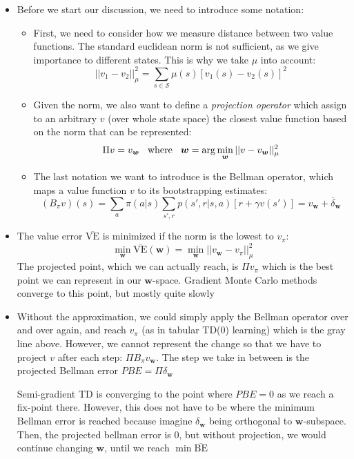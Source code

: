 \begin{itemize}
	\item Before we start our discussion, we need to introduce some notation:
	\begin{itemize}
		\item First, we need to consider how we measure distance between two value functions. The standard euclidean norm is not sufficient, as we give importance to different states. This is why we take $\mu$ into account:
		$$||v_1-v_2||_{\mu}^2 = \sum_{s\in\mathcal{S}} \mu(s)\left[v_1(s)-v_2(s)\right]^2$$
		\item Given the norm, we also want to define a \textit{projection operator} which assign to an arbitrary $v$ (over whole state space) the closest value function based on the norm that can be represented:
		$$\Pi v = v_{\bm{w}}\hspace{3mm}\text{where}\hspace{3mm}\bm{w}=\arg\min_{\bm{w}}||v-v_{\bm{w}}||_{\mu}^2 $$
		\item The last notation we want to introduce is the Bellman operator, which maps a value function $v$ to its bootstrapping estimates:
		$$(B_{\pi}v)(s) = \sum_a \pi(a|s)\sum_{s',r}p(s',r|s,a)[r+\gamma v(s')] = v_{\bm{w}} + \overline{\delta}_{\bm{w}}$$
	\end{itemize}
	\item The value error $\overline{\text{VE}}$ is minimized if the norm is the lowest to $v_{\pi}$: $$\min_{\bm{w}} \overline{\text{VE}}(\bm{w}) = \min_{\bm{w}} ||v_{\bm{w}}-v_{\pi}||_{\mu}^2 $$
	The projected point, which we can actually reach, is $\Pi v_{\pi}$ which is the best point we can represent in our $\bm{w}$-space. Gradient Monte Carlo methods converge to this point, but mostly quite slowly
	\item Without the approximation, we could simply apply the Bellman operator  over and over again, and reach $v_{\pi}$ (as in tabular TD(0) learning) which is the gray line above. However, we cannot represent the change so that we have to project $v$ after each step: $\Pi B_{\pi}v_{\bm{w}}$. The step we take in between is the projected Bellman error $PBE=\Pi\delta_{\bm{w}}$ 
	
	Semi-gradient TD is converging to the point where $PBE=0$ as we reach a fix-point there. However, this does not have to be where the minimum Bellman error is reached because imagine $\delta_{\bm{w}}$ being orthogonal to $\bm{w}$-subspace. Then, the projected bellman error is 0, but without projection, we would continue changing $\bm{w}$, until we reach $\min \overline{\text{BE}}$
	

\end{itemize}
